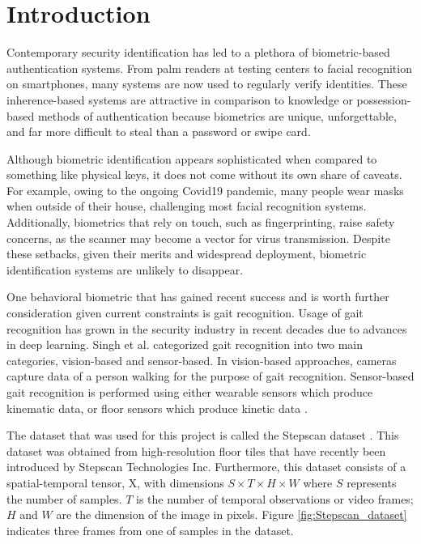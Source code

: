 \section{Introduction}

Contemporary security identification has led to a plethora of biometric-based authentication systems. From palm readers at testing centers to facial recognition on smartphones, many systems are now used to regularly verify identities. These inherence-based systems are attractive in comparison to knowledge or possession-based methods of authentication because biometrics are unique, unforgettable, and far more difficult to steal than a password or swipe card.

Although biometric identification appears sophisticated when compared to something like physical keys, it does not come without its own share of caveats. For example, owing to the ongoing Covid19 pandemic, many people wear masks when outside of their house, challenging most facial recognition systems. Additionally, biometrics that rely on touch, such as fingerprinting, raise safety concerns, as the scanner may become a vector for virus transmission. Despite these setbacks, given their merits and widespread deployment, biometric identification systems are unlikely to disappear.

One behavioral biometric that has gained recent success and is worth further consideration given current constraints is gait recognition. Usage of gait recognition has grown in the security industry in recent decades due to advances in deep learning. Singh et al. \cite{Singh2019APerspectives} categorized gait recognition into two main categories, vision-based and sensor-based. In vision-based approaches, cameras capture data of a person walking for the purpose of gait recognition. Sensor-based gait recognition is performed using either wearable sensors which produce kinematic data, or floor sensors which produce kinetic data \cite{Connor2018BiometricFeatures}.


The dataset that was used for this project is called the Stepscan dataset \cite{Connor2015ComparingBiometrics}. This dataset was obtained from high-resolution floor tiles that have recently been introduced by Stepscan Technologies Inc. Furthermore, this dataset consists of a spatial-temporal tensor, X, with dimensions $S \times T \times H \times W$ where $S$ represents the number of samples. $T$ is the number of temporal observations or video frames; $H$ and $W$ are the dimension of the image in pixels. Figure \ref{fig:Stepscan_dataset} indicates three frames from one of samples in the dataset.  

